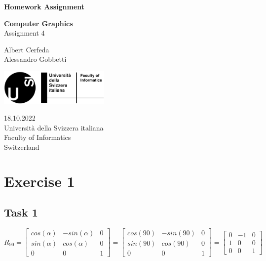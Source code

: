 \documentclass[tikz,14pt,fleqn]{article}
\newcommand\namesurname{Albert Cerfeda\\Alessandro Gobbetti}
\newcommand\assignment{Assignment 4}
\newcommand\subject{Computer Graphics}
\newcommand\documentdate{18.10.2022}
\begin{document}
\begin{titlepage}
   \begin{center}
       \vspace*{1cm}

       \textbf{\Large{Homework Assignment}}

       \vspace{0.5cm}
        \textbf{\subject}\\[5mm]
       \assignment
        
            
       \vspace{1.8cm}

        \namesurname
       \tableofcontents

       \vspace*{\fill}
     
        \includegraphics[width=0.4\textwidth]{fig/logo.png}
       
        \documentdate \\
        Università della Svizzera italiana\\
        Faculty of Informatics\\
        Switzerland\\

   \end{center}
\end{titlepage}



\section{Exercise 1}
\subsection{Task 1}
\[
R_{90} = 
\begin{bmatrix}
cos(\alpha) & -sin(\alpha) & 0\\
sin(\alpha) & cos(\alpha) & 0\\
0 & 0 & 1
\end{bmatrix} = 
\begin{bmatrix}
cos(90) & -sin(90) & 0\\
sin(90) & cos(90) & 0\\
0 & 0 & 1
\end{bmatrix} =
\begin{bmatrix}
0 & -1 & 0\\
1 & 0 & 0\\
0 & 0 & 1
\end{bmatrix}
\]
\end{document}
